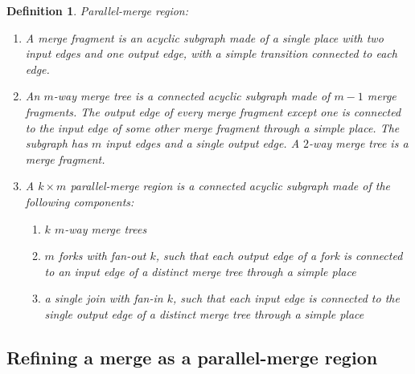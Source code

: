 \documentclass[12pt,a4paper]{article}
\newtheorem{definition}{Definition}
\begin{document}
\begin{definition}
  Parallel-merge region:
  \begin{enumerate}
  \item A {\em merge fragment} is an acyclic subgraph made of a single
    place with two input edges and one output edge, with a simple
    transition connected to each edge.
  \item An {\em $m$-way merge tree} is a connected acyclic subgraph
    made of $m-1$ merge fragments. The output edge of every merge
    fragment except one is connected to the input edge of some other
    merge fragment through a simple place. The subgraph has $m$ input
    edges and a single output edge. A $2$-way merge tree is a merge
    fragment.
  \item A {\em $k \times m$ parallel-merge region} is a connected
    acyclic subgraph made of the following components:
    \begin{enumerate}
    \item $k$ $m$-way merge trees
    \item $m$ forks with fan-out $k$, such that each output edge of a
      fork is connected to an input edge of a distinct merge tree
      through a simple place
    \item a single join with fan-in $k$, such that each input edge is
      connected to the single output edge of a distinct merge tree
      through a simple place
    \end{enumerate}
  \end{enumerate}
\end{definition}

\subsection{Refining a merge as a parallel-merge region}
\label{sec:refine-merge}
\end{document}
